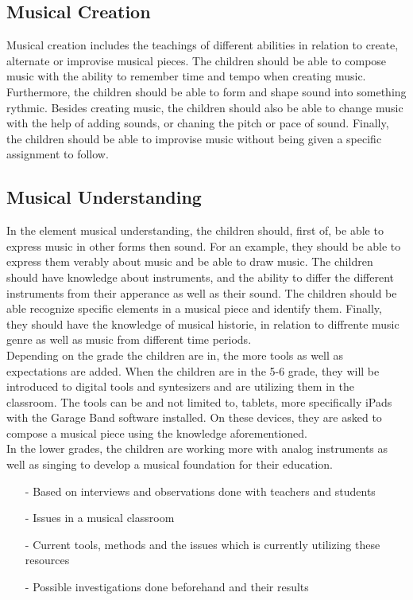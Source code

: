 	\subsection*{Musical Creation}
	Musical creation includes the teachings of different abilities in relation to create, alternate or improvise musical pieces. The children should be able to compose music with the ability to remember time and tempo when creating music. Furthermore, the children should be able to form and shape sound into something rythmic. Besides creating music, the children should also be able to change music with the help of adding sounds, or chaning the pitch or pace of sound. Finally, the children should be able to improvise music without being given a specific assignment to follow.
	
	\subsection*{Musical Understanding}
	In the element musical understanding, the children should, first of, be able to express music in other forms then sound. For an example, they should be able to express them verably about music and be able to draw music. The children should have knowledge about instruments, and the ability to differ the different instruments from their apperance as well as their sound. The children should be able recognize specific elements in a musical piece and identify them. Finally, they should have the knowledge of musical historie, in relation to diffrente music genre as well as music from different time periods.
	\\
	
	Depending on the grade the children are in, the more tools as well as expectations are added. When the children are in the 5-6 grade, they will be introduced to digital tools and syntesizers and are utilizing them in the classroom. The tools can be and not limited to, tablets, more specifically iPads with the Garage Band software installed. On these devices, they are asked to compose a musical piece using the knowledge aforementioned.\\
	In the lower grades, the children are working more with analog instruments as well as singing to develop a musical foundation for their education.
	\\
\begin{itemize}
	\item[-] Based on interviews and observations done with teachers and students
	\item[-] Issues in a musical classroom
	\item[-] Current tools, methods and the issues which is currently utilizing these resources
	\item[-] Possible investigations done beforehand and their results	
\end{itemize}

